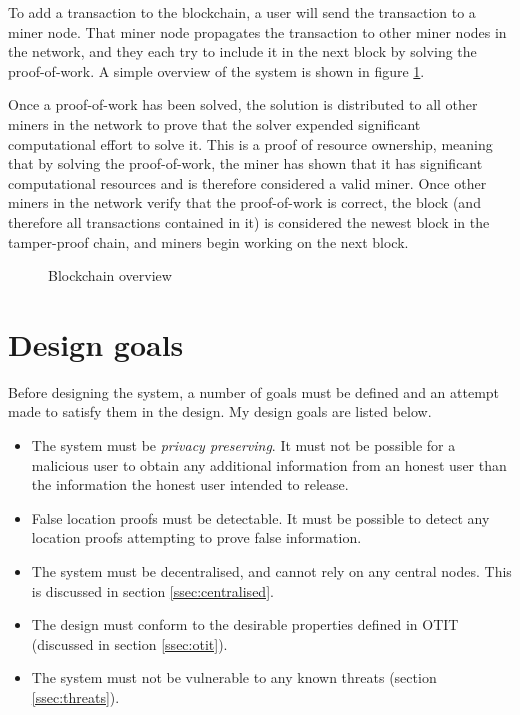 To add a transaction to the blockchain, a user will send the transaction to a miner node. That miner node propagates the transaction to other miner nodes in the network, and they each try to include it in the next block by solving the proof-of-work. A simple overview of the system is shown in figure \ref{fig:blockchain}.

Once a proof-of-work has been solved, the solution is distributed to all other miners in the network to prove that the solver expended significant computational effort to solve it. This is a proof of resource ownership, meaning that by solving the proof-of-work, the miner has shown that it has significant computational resources and is therefore considered a valid miner. Once other miners in the network verify that the proof-of-work is correct, the block (and therefore all transactions contained in it) is considered the newest block in the tamper-proof chain, and miners begin working on the next block.

\begin{figure}[H]
\begin{center}

\end{center}
\caption{Blockchain overview}
\label{fig:blockchain}
\end{figure}

\section{Design goals} \label{sec:design_goals}
Before designing the system, a number of goals must be defined and an attempt made to satisfy them in the design. My design goals are listed below.

\begin{itemize}
	\item The system must be \textit{privacy preserving}. It must not be possible for a malicious user to obtain any additional information from an honest user than the information the honest user intended to release.
	\item False location proofs must be detectable. It must be possible to detect any location proofs attempting to prove false information.
	\item The system must be decentralised, and cannot rely on any central nodes. This is discussed in section \ref{ssec:centralised}.
	\item The design must conform to the desirable properties defined in OTIT (discussed in section \ref{ssec:otit}).
	\item The system must not be vulnerable to any known threats (section \ref{ssec:threats}).
\end{itemize}

